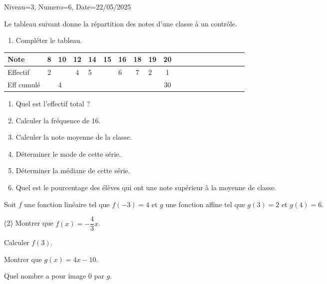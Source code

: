 \documentclass[12pt]{article}
\begin{document}
\begin{Maquette}[DS]{Niveau=3, Numero=6, Date=22/05/2025}


\begin{exercice}[BaremeDetaille=true]
\begin{minipage}{.42\linewidth}
Le tableau suivant donne la répartition des notes d'une classe à un contrôle.
\begin{enumerate}
\item{} Compléter le tableau.
 \end{enumerate}
 \end{minipage}%
 \begin{minipage}{.58\linewidth}
\begin{tabular}{|Oc|Oc|Oc|Oc|Oc|Oc|Oc|Oc|Oc|Oc|}
\hline 
Note & 8 & 10 & 12 & 14 & 15 & 16 & 18 & 19 & 20 \\ 
\hline 
Effectif & 2 &  & 4 & 5 &  & 6 & 7 & 2 & 1 \\ 
\hline 
Eff cumulé &  & 4 &  &  &  &  &  &  & 30 \\ 
\hline 
\end{tabular} 
\end{minipage}%
\begin{enumerate}[start=2]
\item{} Quel est l'effectif total ?
 \anserline[1]
\item{} Calculer la fréquence   de 16.\anserline[1]
\item{} Calculer la note moyenne de la classe.\anserline[2]
\item{} Déterminer le mode de cette série.\anserline[1]
\item{} Déterminer la médiane de cette série.\anserline[1]
\item{} Quel est le pourcentage des élèves qui ont une note supérieur à la moyenne de classe.\par\anserline[1]
\end{enumerate}
\end{exercice}

\begin{exercice}[BaremeDetaille=true]
Soit $f$ une fonction linéaire tel que $f(-3)=4$ et $g$ une fonction affine tel que $g(3)=2$ et $g(4)=6$.
\begin{tasks}[label=\arabic*.](2)
\task{} Montrer que $f(x)=-\dfrac{4}{3}x$.
\par\anserline[3]
\task{} Calculer $f(3)$.\par\anserline[3]
\task{}  Montrer que $g(x)=4x-10$.
\par\anserline[4]
\task{} Quel nombre a pour image 0 par $g$.\par\anserline[4]
\end{tasks}
\end{exercice}


\end{Maquette}
\end{document}
